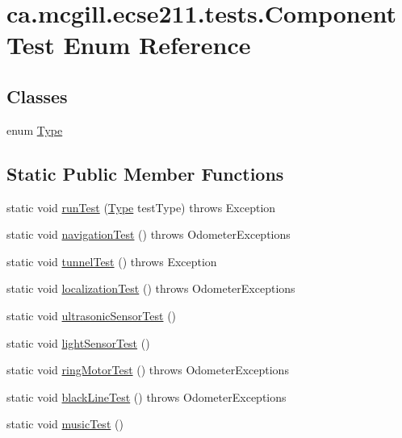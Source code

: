 \hypertarget{enumca_1_1mcgill_1_1ecse211_1_1tests_1_1_component_test}{}\section{ca.\+mcgill.\+ecse211.\+tests.\+Component\+Test Enum Reference}
\label{enumca_1_1mcgill_1_1ecse211_1_1tests_1_1_component_test}
\subsection*{Classes}
\begin{DoxyCompactItemize}
\item 
enum \hyperlink{enumca_1_1mcgill_1_1ecse211_1_1tests_1_1_component_test_1_1_type}{Type}
\end{DoxyCompactItemize}
\subsection*{Static Public Member Functions}
\begin{DoxyCompactItemize}
\item 
static void \hyperlink{enumca_1_1mcgill_1_1ecse211_1_1tests_1_1_component_test_a5dc8bf97bc48adf5bee88d425a1a974e}{run\+Test} (\hyperlink{enumca_1_1mcgill_1_1ecse211_1_1tests_1_1_component_test_1_1_type}{Type} test\+Type)  throws Exception 
\item 
static void \hyperlink{enumca_1_1mcgill_1_1ecse211_1_1tests_1_1_component_test_aa40592bb550b3526402faddbc0d890c7}{navigation\+Test} ()  throws Odometer\+Exceptions 
\item 
static void \hyperlink{enumca_1_1mcgill_1_1ecse211_1_1tests_1_1_component_test_ae85caa20c6391bacc4fdbd411ee3f113}{tunnel\+Test} ()  throws Exception 
\item 
static void \hyperlink{enumca_1_1mcgill_1_1ecse211_1_1tests_1_1_component_test_ad11712dd74c5c64e84cd71186a59a087}{localization\+Test} ()  throws Odometer\+Exceptions 
\item 
static void \hyperlink{enumca_1_1mcgill_1_1ecse211_1_1tests_1_1_component_test_a05cd9d95458b11ed57ca001a28fffa7c}{ultrasonic\+Sensor\+Test} ()
\item 
static void \hyperlink{enumca_1_1mcgill_1_1ecse211_1_1tests_1_1_component_test_a3e8288f482b3806a0f3c4668951f3e36}{light\+Sensor\+Test} ()
\item 
static void \hyperlink{enumca_1_1mcgill_1_1ecse211_1_1tests_1_1_component_test_a1ecca45b47067d825683cf46dcf22b62}{ring\+Motor\+Test} ()  throws Odometer\+Exceptions 
\item 
static void \hyperlink{enumca_1_1mcgill_1_1ecse211_1_1tests_1_1_component_test_a3f36cee9ca567c845377bec33554ba8b}{black\+Line\+Test} ()  throws Odometer\+Exceptions 
\item 
static void \hyperlink{enumca_1_1mcgill_1_1ecse211_1_1tests_1_1_component_test_a743c9bb90a8c8bc3fcf3b4c591990e7f}{music\+Test} ()
\end{DoxyCompactItemize}



